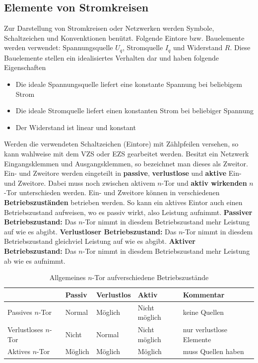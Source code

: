\subsection{Elemente von Stromkreisen}
Zur Darstellung von Stromkreisen oder Netzwerken werden Symbole, Schaltzeichen und Konvenktionen benützt. Folgende Eintore bzw. Bauelemente werden verwendet: Spannungsquelle $U_q$, Stromquelle $I_q$ und Widerstand $R$. Diese Bauelemente stellen ein idealisiertes Verhalten dar und haben folgende Eigenschaften
\begin{itemize}
\item Die ideale Spannungsquelle liefert eine konstante Spannung bei beliebigem Strom
\item Die ideale Stromquelle liefert einen konstanten Strom bei beliebiger Spannung
\item Der Widerstand ist linear und konstant
\end{itemize}
Werden die verwendeten Schaltzeichen (Eintore) mit Zählpfeilen versehen, so kann wahlweise mit dem VZS oder EZS gearbeitet werden. Besitzt ein Netzwerk Eingangsklemmen und Ausgangsklemmen, so bezeichnet man dieses als Zweitor.
\newline\newline
Ein- und Zweitore werden eingeteilt in \textbf{passive}, \textbf{verlustlose} und \textbf{aktive} Ein- und Zweitore. Dabei muss noch zwischen aktivem $n$-Tor und \textbf{aktiv wirkenden} $n$-Tor unterschieden werden. Ein- und Zweitore können in verschiedenen \textbf{Betriebszuständen} betrieben werden. So kann ein aktives Eintor auch einen Betriebszustand aufweisen, wo es passiv wirkt, also Leistung aufnimmt.
\newline\newline
\textbf{Passiver Betriebszustand: } Das $n$-Tor nimmt in diesdem Betriebszustand mehr Leistung auf wie es abgibt.
\newline\newline
\textbf{Verlustloser Betriebszustand: } Das $n$-Tor nimmt in diesdem Betriebszustand gleichviel Leistung auf wie es abgibt.
\newline\newline
\textbf{Aktiver Betriebszustand: } Das $n$-Tor nimmt in diesdem Betriebszustand mehr Leistung ab wie es aufnimmt.
\begin{table}[H]
\centering
\begin{tabular}{lllll}
\hline
&Passiv&Verlustlos&Aktiv&Kommentar\\\hline
Passives $n$-Tor&Normal&Möglich&Nicht möglich&keine Quellen\\
Verlustloses $n$-Tor&Nicht&Normal&Nicht möglich&nur verlustlose Elemente\\
Aktives $n$-Tor&Möglich&Möglich&Möglich&muss Quellen haben\\
\hline
\end{tabular}
\caption{Allgemeines $n$-Tor aufverschiedene Betriebszustände}
\end{table}
